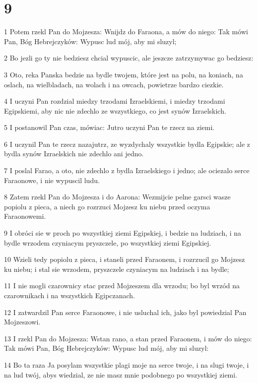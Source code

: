 \chapter{9}

\par 1 Potem rzekl Pan do Mojzesza: Wnijdz do Faraona, a mów do niego: Tak mówi Pan, Bóg Hebrejczyków: Wypusc lud mój, aby mi sluzyl;
\par 2 Bo jezli go ty nie bedziesz chcial wypuscic, ale jeszcze zatrzymywac go bedziesz:
\par 3 Oto, reka Panska bedzie na bydle twojem, które jest na polu, na koniach, na oslach, na wielbladach, na wolach i na owcach, powietrze bardzo ciezkie.
\par 4 I uczyni Pan rozdzial miedzy trzodami Izraelskiemi, i miedzy trzodami Egipskiemi, aby nic nie zdechlo ze wszystkiego, co jest synów Izraelskich.
\par 5 I postanowil Pan czas, mówiac: Jutro uczyni Pan te rzecz na ziemi.
\par 6 I uczynil Pan te rzecz nazajutrz, ze wyzdychaly wszystkie bydla Egipskie; ale z bydla synów Izraelskich nie zdechlo ani jedno.
\par 7 I poslal Farao, a oto, nie zdechlo z bydla Izraelskiego i jedno; ale ociezalo serce Faraonowe, i nie wypuscil ludu.
\par 8 Zatem rzekl Pan do Mojzesza i do Aarona: Wezmijcie pelne garsci wasze popiolu z pieca, a niech go rozrzuci Mojzesz ku niebu przed oczyma Faraonowemi.
\par 9 I obróci sie w proch po wszystkiej ziemi Egipskiej, i bedzie na ludziach, i na bydle wrzodem czyniacym pryszczele, po wszystkiej ziemi Egipskiej.
\par 10 Wzieli tedy popiolu z pieca, i staneli przed Faraonem, i rozrzucil go Mojzesz ku niebu; i stal sie wrzodem, pryszczele czyniacym na ludziach i na bydle;
\par 11 I nie mogli czarownicy stac przed Mojzeszem dla wrzodu; bo byl wrzód na czarownikach i na wszystkich Egipczanach.
\par 12 I zatwardzil Pan serce Faraonowe, i nie usluchal ich, jako byl powiedzial Pan Mojzeszowi.
\par 13 I rzekl Pan do Mojzesza: Wstan rano, a stan przed Faraonem, i mów do niego: Tak mówi Pan, Bóg Hebrejczyków: Wypusc lud mój, aby mi sluzyl:
\par 14 Bo ta raza Ja posylam wszystkie plagi moje na serce twoje, i na slugi twoje, i na lud twój, abys wiedzial, ze nie masz mnie podobnego po wszystkiej ziemi.

